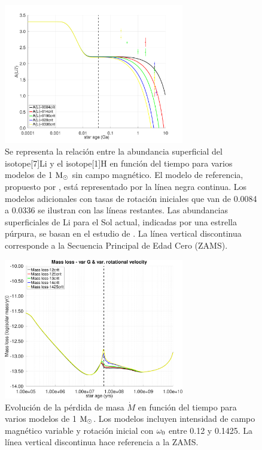 \begin{figure}
	\centering
	\includegraphics[width=0.7\textwidth]{img/paper2/li_var_vel_0_0g_0.pdf}
	\caption{Se representa la relación entre la abundancia superficial del isotope[7]{Li} y el isotope[1]{H} en función del tiempo para varios modelos de 1 $\mathrm{M}_\odot$ sin campo magnético. El modelo de referencia, propuesto por \cite{Choi2016}, está representado por la línea negra continua. Los modelos adicionales con tasas de rotación iniciales que van de 0.0084 a 0.0336 se ilustran con las líneas restantes. Las abundancias superficiales de Li para el Sol actual, indicadas por una estrella púrpura, se basan en el estudio de \cite{Asplund2009}. La línea vertical discontinua corresponde a la Secuencia Principal de Edad Cero (ZAMS).}
	\label{fig:li_var_vel_0g_ii}
\end{figure}

\begin{figure}
	\includegraphics[width=0.7\textwidth]{img/paper2/mdot_var_vel_g3.pdf}
	\caption{Evolución de la pérdida de masa $\Dot{M}$ en función del tiempo para varios modelos de 1 $\mathrm{M}_\odot$. Los modelos incluyen intensidad de campo magnético variable y rotación inicial con $\omega_{\mathrm{0}}$ entre 0.12 y 0.1425. La línea vertical discontinua hace referencia a la ZAMS.}
	\label{fig:mdot_var_vel_g3}
\end{figure}


